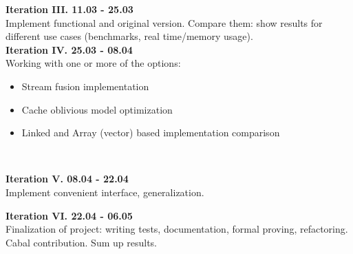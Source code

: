\documentclass[sigconf]{acmart}
\begin{document}
\textbf{Iteration III. 11.03 - 25.03}\\
Implement functional and original version. Compare them: show results for different use cases (benchmarks, real time/memory usage).\\

\textbf{Iteration IV. 25.03 - 08.04}\\
Working with one or more of the options:
\begin{itemize} 
\item Stream fusion implementation
\item Cache oblivious model optimization
\item Linked and Array (vector) based implementation comparison
\end{itemize} 
\ 

\textbf{Iteration V. 08.04 - 22.04} \\
Implement convenient interface, generalization.
\\ \par
\textbf{Iteration VI. 22.04 - 06.05} \\
Finalization of project: writing tests, documentation, formal proving, refactoring. Cabal contribution. Sum up results.
\end{document}
